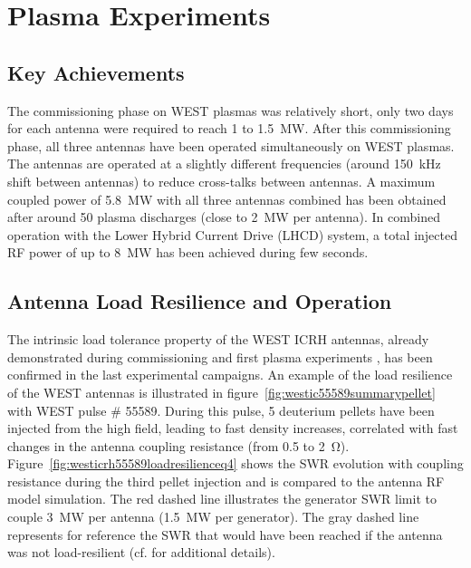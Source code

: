 \documentclass[12p]{iopart}
\begin{document}
\section{Plasma Experiments}
\subsection{Key Achievements}
The commissioning phase on WEST plasmas was relatively short, only two days for each antenna were required to reach 1 to \SI{1.5}{\mega\watt}. After this commissioning phase, all three antennas have been operated simultaneously on WEST plasmas. The antennas are operated at a slightly different frequencies (around \SI{150}{\kilo\hertz} shift between antennas) to reduce cross-talks between antennas. A maximum coupled power of \SI{5.8}{\mega\watt} with all three antennas combined has been obtained after around 50 plasma discharges (close to \SI{2}{\mega\watt} per antenna). In combined operation with the Lower Hybrid Current Drive (LHCD) system, a total injected RF power of up to \SI{8}{\mega\watt} has been achieved during few seconds\cite{bucalossi2021}. 



\subsection{Antenna Load Resilience and Operation}
The intrinsic load tolerance property of the WEST ICRH antennas, already demonstrated during commissioning and first plasma experiments \cite{helou2020}, has been confirmed in the last experimental campaigns. An example of the load resilience of the WEST antennas is illustrated in figure~\ref{fig:westic55589summarypellet} with WEST pulse \# 55589. During this pulse, 5 deuterium pellets have been injected from the high field, leading to fast density increases, correlated with fast changes in the antenna coupling resistance (from 0.5 to \SI{2}{\ohm}).  Figure~\ref{fig:westicrh55589loadresilienceq4} shows the SWR evolution with coupling resistance during the third pellet injection and is compared to the antenna RF model simulation. The red dashed line illustrates the generator SWR limit to couple \SI{3}{\mega\watt} per antenna (\SI{1.5}{\mega\watt} per generator). The gray dashed line represents for reference the SWR that would have been reached if the antenna was not load-resilient (cf.\cite{helou2020} for additional details). 
\end{document}
